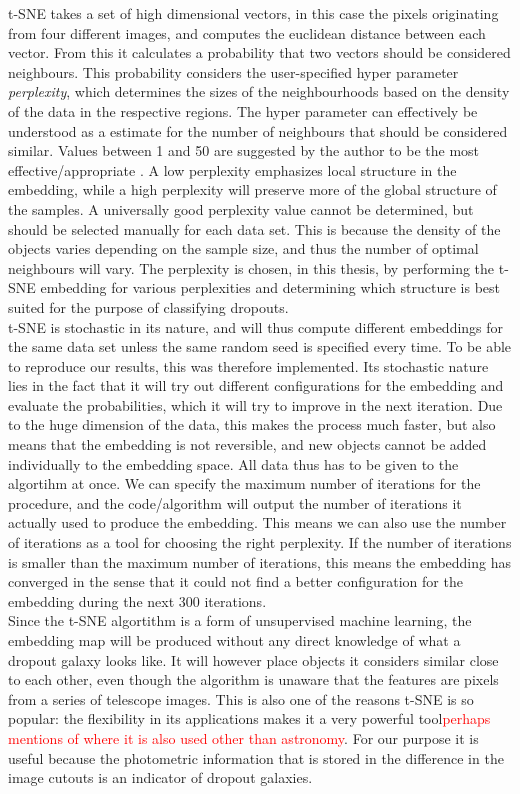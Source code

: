 t-SNE takes a set of high dimensional vectors, in this case the pixels originating from four different images, and computes the euclidean distance between each vector. From this it calculates a probability that two vectors should be considered neighbours. This probability considers the user-specified hyper parameter \textit{perplexity}, which determines the sizes of the neighbourhoods based on the density of the data in the respective regions. The hyper parameter can effectively be understood as a estimate for the number of neighbours that should be considered similar. Values between 1 and 50 are suggested by the author to be the most effective/appropriate \cite{Maaten_2008_tSNE}. A low perplexity emphasizes local structure in the embedding, while a high perplexity will preserve more of the global structure of the samples. A universally good perplexity value cannot be determined, but should be selected manually for each data set. This is because the density of the objects varies depending on the sample size, and thus the number of optimal neighbours will vary. The perplexity is chosen, in this thesis, by performing the t-SNE embedding for various perplexities and determining which structure is best suited for the purpose of classifying dropouts. \\
t-SNE is stochastic in its nature, and will thus compute different embeddings for the same data set unless the same random seed is specified every time. To be able to reproduce our results, this was therefore implemented. Its stochastic nature lies in the fact that it will try out different configurations for the embedding and evaluate the probabilities, which it will try to improve in the next iteration. Due to the huge dimension of the data, this makes the process much faster, but also means that the embedding is not reversible, and new objects cannot be added individually to the embedding space. All data thus has to be given to the algortihm at once. We can specify the maximum number of iterations for the procedure, and the code/algorithm will output the number of iterations it actually used to produce the embedding. This means we can also use the number of iterations as a tool for choosing the right perplexity. If the number of iterations is smaller than the maximum number of iterations, this means the embedding has converged in the sense that it could not find a better configuration for the embedding during the next 300 iterations. \\
Since the t-SNE algortithm is a form of unsupervised machine learning, the embedding map will be produced without any direct knowledge of what a dropout galaxy looks like. It will however place objects it considers similar close to each other, even though the algorithm is unaware that the features are pixels from a series of telescope images. This is also one of the reasons t-SNE is so popular: the flexibility in its applications makes it a very powerful tool\textcolor{red}{perhaps mentions of where it is also used other than astronomy}. For our purpose it is useful because the photometric information that is stored in the difference in the image cutouts is an indicator of dropout galaxies.

